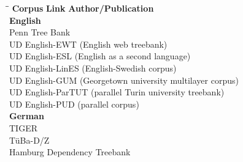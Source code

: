 \begin{tabbing}
	\hspace*{8.5cm}\=\hspace*{1.5cm}\=\kill
	\textbf{Corpus} \> \textbf{Link} \> \textbf{Author/Publication}
	\\[3mm]
	 \textbf{English}
	\\[2mm]
	Penn Tree Bank 
		\> 	\href{https://www.kaggle.com/nltkdata/penn-tree-bank/downloads/penn-tree-bank.zip/5}{}
		\>	\citep{Marcus.1994}
	\\[2mm]
	UD English-EWT {\footnotesize(English web treebank)}		
		\>	\href{https://github.com/UniversalDependencies/UD_English-EWT/tree/master}{}
		\>	\citep{Silveira.2014}
	\\[2mm]
	UD English-ESL {\footnotesize(English as a second language)}			
		\>	\href{https://github.com/UniversalDependencies/UD_English-ESL}{}
		\>	\citep{Berzak.2016,Yannakoudakis.2011}
	\\[2mm]
	UD English-LinES {\footnotesize(English-Swedish corpus)}
		\>	\href{https://github.com/UniversalDependencies/UD_English-LinES}{}
		\>	\citep{Ahrenberg.2007,Ahrenberg.2015}
	\\[2mm]
	UD English-GUM {\footnotesize(Georgetown university multilayer corpus)}
		\>	\href{https://github.com/UniversalDependencies/UD_English-GUM/tree/master}{}
		\>	\citep{Zeldes.2017}
	\\[2mm]
	UD English-ParTUT {\footnotesize(parallel Turin university treebank)}
		\>	\href{https://github.com/UniversalDependencies/UD_English-ParTUT/tree/master}{}
		\>	\citep{Sanguinetti.2014a,Sanguinetti.2014b}
	\\[2mm]
	UD English-PUD {\footnotesize(parallel corpus)}
		\>	\href{https://github.com/UniversalDependencies/UD_English-PUD/tree/master}{}
		\>	\citep{McDonald.2013}
	\\[3mm]
	 \textbf{German}
	\\[2mm]
	TIGER
		\> 	\href{https://www.ims.uni-stuttgart.de/forschung/ressourcen/korpora/tiger.html}{}
		\>	\citep{Brants.2004}
	\\[2mm]
	TüBa-D/Z
		\> 	\href{https://uni-tuebingen.de/de/134290}{}
		\>	\citep{Hinrichs.2000}
	\\[2mm]
	Hamburg Dependency Treebank
		\> 	\href{https://corpora.uni-hamburg.de/hzsk/de/islandora/object/treebank:hdt}{}
		\> 	\citep{Foth.2014}
	\\[2mm]

\end{tabbing}
